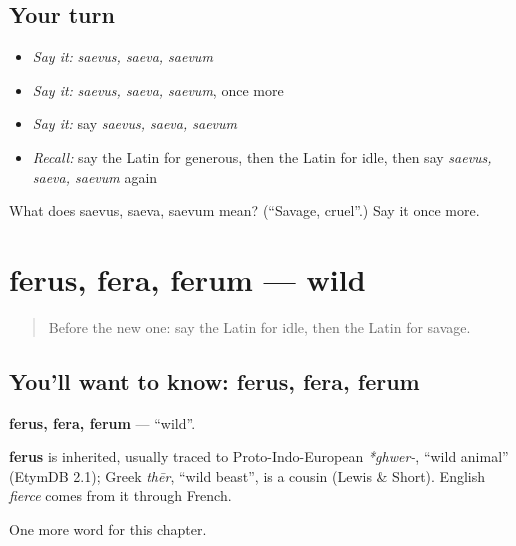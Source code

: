 \subsection*{Your turn}
\begin{itemize}
\raggedright
  \item \emph{Say it:} \emph{saevus, saeva, saevum}
  \item \emph{Say it:} \emph{saevus, saeva, saevum}, once more
  \item \emph{Say it:} say \emph{saevus, saeva, saevum}
  \item \emph{Recall:} say the Latin for generous, then the Latin for idle, then say \emph{saevus, saeva, saevum} again
\end{itemize}

\begin{tcolorbox}[breakable,colback=teal!4,colframe=teal!35!black,title={Before you move on}]
What does saevus, saeva, saevum mean? (\textquotedblleft{}Savage, cruel\textquotedblright{}.) Say it once more.
\end{tcolorbox}
\section[ferus, fera, ferum]{ferus, fera, ferum — wild}

\label{lesson:LA-C214-ferus}



\begin{quote}
Before the new one: say the Latin for idle, then the Latin for savage.
\end{quote}

\subsection*{You'll want to know: ferus, fera, ferum}
\textbf{ferus, fera, ferum} — \textquotedblleft{}wild\textquotedblright{}.

\begin{cousinweb}
\textbf{ferus} is inherited, usually traced to Proto-Indo-European \emph{*ghwer-}, \textquotedblleft{}wild animal\textquotedblright{} (EtymDB 2.1); Greek \emph{thēr}, \textquotedblleft{}wild beast\textquotedblright{}, is a cousin (Lewis \& Short). English \emph{fierce} comes from it through French.
\end{cousinweb}

\begin{grammarlens}[title={What you've built}]
One more word for this chapter.
\end{grammarlens}


